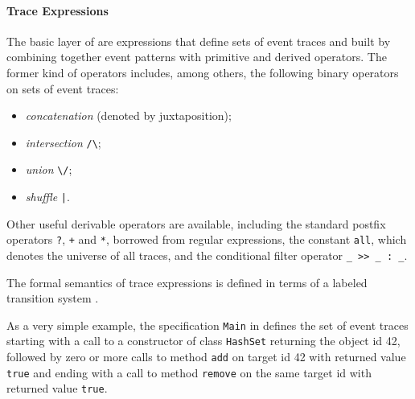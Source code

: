\paragraph{Trace Expressions}
The basic layer of \rml are expressions that define sets of event traces and built by combining together event patterns with primitive and derived operators.
The former kind of operators includes, among others, the following binary operators on sets of event traces:
\begin{itemize}
	\item \emph{concatenation} (denoted by juxtaposition);
	\item \emph{intersection} \lstinline{/\};
	\item \emph{union} \lstinline{\/}; 
	\item \emph{shuffle} \lstinline{|}. 
\end{itemize}
Other useful derivable operators are available, including the standard postfix operators
\lstinline{?}, \lstinline{+} and \lstinline{*}, borrowed from regular expressions,  the constant \lstinline{all}, which denotes the universe of all traces,
and the  conditional filter operator \lstinline{_ >> _ : _}.

The formal semantics of trace expressions is defined in terms of a labeled transition system \cite{RML2021}.

As a very simple example, the specification \lstinline{Main} in  defines the set of event traces starting with a call to
a constructor of class \lstinline{HashSet} returning the object id 42, followed by zero or more calls to method \lstinline{add} on target id 42 with returned value \lstinline{true} and ending with a call to method \lstinline{remove} on the same target id with returned value \lstinline{true}.

